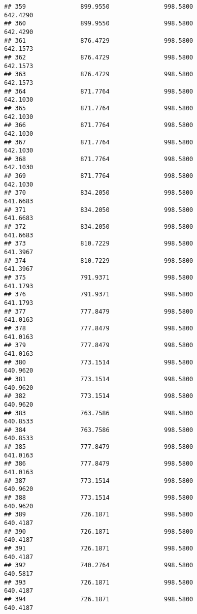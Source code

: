 \documentclass[]{article}
\begin{document}
\begin{verbatim}
## 359               899.9550               998.5800            642.4290
## 360               899.9550               998.5800            642.4290
## 361               876.4729               998.5800            642.1573
## 362               876.4729               998.5800            642.1573
## 363               876.4729               998.5800            642.1573
## 364               871.7764               998.5800            642.1030
## 365               871.7764               998.5800            642.1030
## 366               871.7764               998.5800            642.1030
## 367               871.7764               998.5800            642.1030
## 368               871.7764               998.5800            642.1030
## 369               871.7764               998.5800            642.1030
## 370               834.2050               998.5800            641.6683
## 371               834.2050               998.5800            641.6683
## 372               834.2050               998.5800            641.6683
## 373               810.7229               998.5800            641.3967
## 374               810.7229               998.5800            641.3967
## 375               791.9371               998.5800            641.1793
## 376               791.9371               998.5800            641.1793
## 377               777.8479               998.5800            641.0163
## 378               777.8479               998.5800            641.0163
## 379               777.8479               998.5800            641.0163
## 380               773.1514               998.5800            640.9620
## 381               773.1514               998.5800            640.9620
## 382               773.1514               998.5800            640.9620
## 383               763.7586               998.5800            640.8533
## 384               763.7586               998.5800            640.8533
## 385               777.8479               998.5800            641.0163
## 386               777.8479               998.5800            641.0163
## 387               773.1514               998.5800            640.9620
## 388               773.1514               998.5800            640.9620
## 389               726.1871               998.5800            640.4187
## 390               726.1871               998.5800            640.4187
## 391               726.1871               998.5800            640.4187
## 392               740.2764               998.5800            640.5817
## 393               726.1871               998.5800            640.4187
## 394               726.1871               998.5800            640.4187

\end{verbatim}
\end{document}
